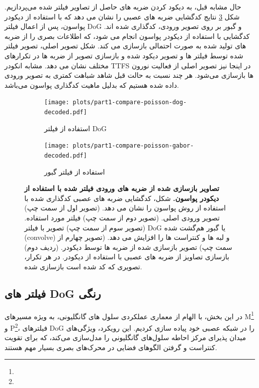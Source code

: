         حال مشابه قبل، به دیکود کردن ضربه های حاصل از تصاویر فیلتر شده می‌پردازیم. شکل
        \ref{fig:part1-compare-poisson-filters-decoded}
        نتایج کدگشایی ضربه های عصبی را نشان می دهد که با استفاده از دیکودر پواسون، پس از اعمال فیلتر 
        DoG 
        و گبور بر روی تصویر ورودی، کدگذاری شده اند. کدگشایی با استفاده از دیکودر پواسون انجام می شود، که اطلاعات بصری را از ضربه های تولید شده به صورت احتمالی بازسازی می کند. شکل تصویر اصلی، تصویر فیلتر شده توسط فیلتر ها و تصویر دیکود شده و بازسازی تصویر از ضربه ها در تکرارهای مختلف نشان می دهد. مشابه انکودر
        TTFS
        در اینجا نیز تصویر اصلی از فعالیت نورون ها بازسازی می‌شود. هر چند نسبت به حالت قبل شاهد شباهت کمتری به تصویر ورودی داده شده هستیم که بدلیل ماهیت کدگذاری پواسون می‌باشد.


        \begin{figure}[!ht]
            \centering
            \begin{subfigure}[b]{\textwidth}
                \texttt{[image: plots/part1-compare-poisson-dog-decoded.pdf]}
                \caption{استفاده از فیلتر DoG}
                \label{fig:part1-compare-poisson-dog-decoded}
            \end{subfigure}
            \vfill %
            \begin{subfigure}[b]{\textwidth}
                \texttt{[image: plots/part1-compare-poisson-gabor-decoded.pdf]}
                \caption{استفاده از فیلتر گبور}
                \label{fig:part1-compare-poisson-gabor-decoded}
            \end{subfigure}
            \caption{\textbf{تصاویر بازسازی شده از ضربه های ورودی فیلتر شده با استفاده از دیکودر پواسون.} 
            شکل، کدگشایی ضربه های عصبی کدگذاری شده با استفاده از روش پواسون
            را نشان می دهد. 
            (تصویر اول از سمت چپ) 
            تصویر ورودی اصلی. 
            (تصویر دوم از سمت چپ) 
            فیلتر مورد استفاده.
            (تصویر سوم از سمت چپ)
            تصویر با فیلتر 
            DoG یا گبور
            هم‌گشت شده
            (convolve)
            و لبه ها و کنتراست ها را افزایش می دهد. 
            (تصویر چهارم از سمت چپ) 
            تصویر بازسازی شده از ضربه ها توسط دیکودر.
            (ردیف دوم)
            بازسازی تصاویز از ضربه های عصبی با استفاده از دیکودر. در هر تکرار، تصویری که کد شده است بازسازی شده.}
            \label{fig:part1-compare-poisson-filters-decoded}
        \end{figure}

        \subsection{فیلتر های DoG رنگی}
            در این بخش، با الهام از معماری عملکردی سلول های گانگلیونی، به ویژه مسیرهای 
            M\footnote{}
            و 
            P\footnote{}، 
            فیلترهای 
            DoG
            را در شبکه عصبی
            خود پیاده سازی کردیم. این رویکرد، ویژگی‌های میدان پذیرای مرکز احاطه سلول‌های گانگلیونی را مدل‌سازی می‌کند، که برای تقویت کنتراست و گرفتن الگوهای فضایی در محرک‌های بصری بسیار مهم هستند.
